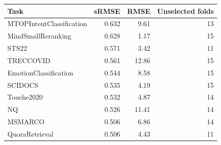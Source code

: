 \begin{tabular}{lrrr}
\toprule Task & sRMSE & RMSE & Unselected folds\\\midrule
MTOPIntentClassification & 0.632 & 9.61 & 13\\
MindSmallReranking & 0.628 & 1.17 & 15\\
STS22 & 0.571 & 3.42 & 11\\
TRECCOVID & 0.561 & 12.86 & 15\\
EmotionClassification & 0.544 & 8.58 & 15\\
SCIDOCS & 0.535 & 4.19 & 15\\
Touche2020 & 0.532 & 4.87 & 14\\
NQ & 0.526 & 11.41 & 14\\
MSMARCO & 0.506 & 6.86 & 14\\
QuoraRetrieval & 0.506 & 4.43 & 11\\
\bottomrule\end{tabular}